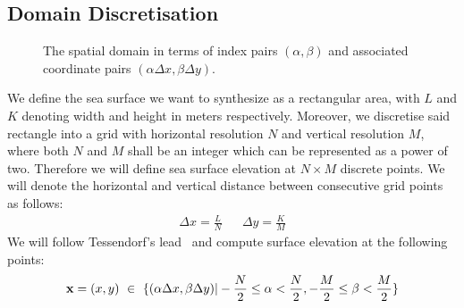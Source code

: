 \subsection{Domain Discretisation}
\label{sec:domain_discretisation}
%
\begin{figure}
\centering
{}
\caption{The spatial domain in terms of index pairs $(\alpha,\beta)$ and
associated coordinate pairs $(\alpha\Delta x,\beta\Delta y)$.}
\label{fig:spatial_domain}
\end{figure}
%
We define the sea surface we want to synthesize as a rectangular area, with $L$
and $K$ denoting width and height in meters respectively. Moreover, we
discretise said rectangle into a grid with horizontal resolution $N$ and
vertical resolution $M$, where both $N$ and $M$ shall be an integer which can
be represented as a power of two. Therefore we will define sea surface elevation 
at $N\times M$ discrete points. We will denote the horizontal and vertical
distance between consecutive grid points as follows:
\begin{align}
 \Delta x = \frac{L}{N} && \Delta y = \frac{K}{M}
\end{align}
We will follow Tessendorf's lead~\cite{course:simulatingocean} and compute
surface elevation at the following points:
\begin{equation}
\label{eq:spatial_domain}
 \mathbf{x} = (x,y)~\in~\{(\alpha\Delta x,\beta\Delta y)|
-\frac{N}{2}\leq\alpha<\frac{N}{2},-\frac{M}{2}\leq\beta<\frac{M}{2}\}
\end{equation}
